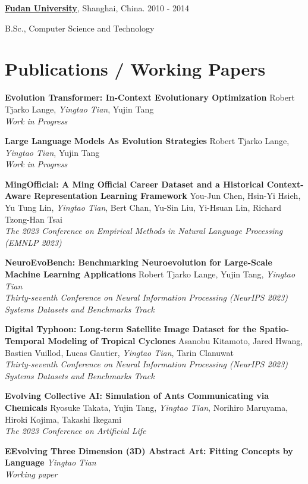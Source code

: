 \documentclass[line,margin]{cv}
\newenvironment{block}
{
  \begin{addmargin}[2em]{0em}%
}
{
  \end{addmargin}
}
\newcommand{\Fudan}{\href{http://www.fudan.edu.cn/englishnew/}{Fudan University}}
\begin{document}
\begin{resume}
  {\bf \Fudan}, Shanghai, China. \hfill 2010 - 2014

  \begin{block}
    B.Sc., Computer Science and Technology 
  \end{block}



\section{Publications / Working Papers}

  {\bf Evolution Transformer: In-Context Evolutionary Optimization}
  Robert Tjarko Lange, \emph{Yingtao Tian}, Yujin Tang\\
  \emph{Work in Progress}
  
  {\bf Large Language Models As Evolution Strategies}
  Robert Tjarko Lange, \emph{Yingtao Tian}, Yujin Tang\\
  \emph{Work in Progress}
  
  {\bf MingOfficial: A Ming Official Career Dataset and a Historical Context-Aware Representation Learning Framework}
  You-Jun Chen, Hsin-Yi Hsieh, Yu Tung Lin, \emph{Yingtao Tian}, Bert Chan, Yu-Sin Liu, Yi-Hsuan Lin, Richard Tzong-Han Tsai\\
  \emph{The 2023 Conference on Empirical Methods in Natural Language Processing (EMNLP 2023)}

  {\bf NeuroEvoBench: Benchmarking Neuroevolution for Large-Scale Machine Learning Applications}
  Robert Tjarko Lange, Yujin Tang, \emph{Yingtao Tian}\\
  \emph{Thirty-seventh Conference on Neural Information Processing (NeurIPS 2023) Systems Datasets and Benchmarks Track}

  {\bf Digital Typhoon: Long-term Satellite Image Dataset for the Spatio-Temporal Modeling of Tropical Cyclones}
  Asanobu Kitamoto, Jared Hwang, Bastien Vuillod, Lucas Gautier, \emph{Yingtao Tian}, Tarin Clanuwat\\
  \emph{Thirty-seventh Conference on Neural Information Processing (NeurIPS 2023) Systems Datasets and Benchmarks Track}

  {\bf Evolving Collective AI: Simulation of Ants Communicating via Chemicals}
  Ryosuke Takata, Yujin Tang, \emph{Yingtao Tian}, Norihiro Maruyama, Hiroki Kojima, Takashi Ikegami\\
  \emph{The 2023 Conference on Artificial Life}

  {\bf EEvolving Three Dimension (3D) Abstract Art: Fitting Concepts by Language}
  \emph{Yingtao Tian}\\
  \emph{Working paper}


\end{resume}
\end{document}
